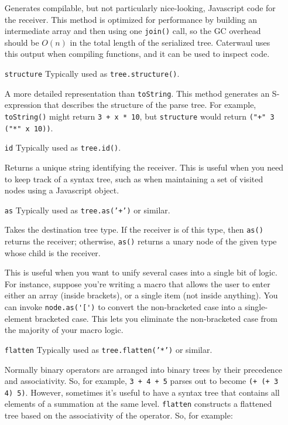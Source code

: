 \documentclass{report}
\begin{document}
\begin{enumerate}
  Generates compilable, but not particularly nice-looking, Javascript code for the receiver. This method is optimized for performance by building an intermediate array and then using one
  {\tt join()} call, so the GC overhead should be $O(n)$ in the total length of the serialized tree. Caterwaul uses this output when compiling functions, and it can be used to inspect
  code.

\item[{\tt structure}]
  Typically used as {\tt tree.structure()}.

  A more detailed representation than {\tt toString}. This method generates an S-expression that describes the structure of the parse tree. For example, {\tt toString()} might return
  {\tt 3 + x * 10}, but {\tt structure} would return \verb|("+" 3 ("*" x 10))|.

\item[{\tt id}]
  Typically used as {\tt tree.id()}.

  Returns a unique string identifying the receiver. This is useful when you need to keep track of a syntax tree, such as when maintaining a set of visited nodes using a Javascript
  object.

\item[{\tt as}]
  Typically used as {\tt tree.as('+')} or similar.

  Takes the destination tree type. If the receiver is of this type, then {\tt as()} returns the receiver; otherwise, {\tt as()} returns a unary node of the given type whose child is the
  receiver.

  This is useful when you want to unify several cases into a single bit of logic. For instance, suppose you're writing a macro that allows the user to enter either an array (inside
  brackets), or a single item (not inside anything). You can invoke \verb|node.as('[')| to convert the non-bracketed case into a single-element bracketed case. This lets you eliminate
  the non-bracketed case from the majority of your macro logic.

\item[{\tt flatten}]
  Typically used as {\tt tree.flatten('*')} or similar.

  Normally binary operators are arranged into binary trees by their precedence and associativity. So, for example, {\tt 3 + 4 + 5} parses out to become \verb|(+ (+ 3 4) 5)|. However,
  sometimes it's useful to have a syntax tree that contains all elements of a summation at the same level. {\tt flatten} constructs a flattened tree based on the associativity of the
  operator. So, for example:


\end{enumerate}
\end{document}
